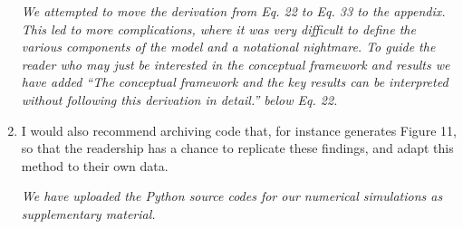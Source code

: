 \documentclass{article}
\begin{document}
\begin{enumerate}
			\emph{We attempted to move the derivation from Eq. 22 to Eq. 33 to the appendix. This led to more complications, where it was very difficult to define the various components of the model and a notational nightmare. To guide the reader who may just be interested in the conceptual framework and results we have added ``The conceptual framework and the key results can be interpreted without following this derivation in detail.'' below Eq. 22.}
			

			\item I would also recommend archiving code that, for instance generates Figure 11, so that the readership has a chance to replicate these findings, and adapt this method to their own data.
			
 			\emph{We have uploaded the Python source codes for our numerical simulations as supplementary material.}
 		
			                                       
			\end{enumerate}  
\end{document}
